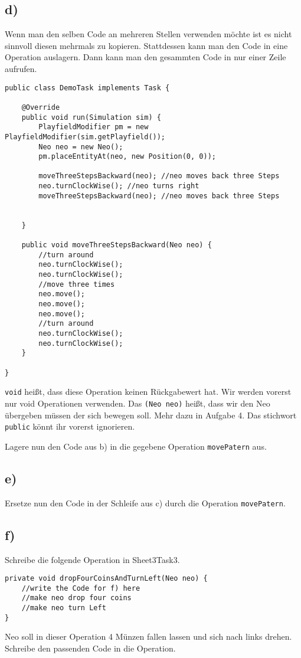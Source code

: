 \subsection*{d)}
	\begin{Infobox}[Operation]
		Wenn man den selben Code an mehreren Stellen verwenden möchte ist es nicht sinnvoll diesen mehrmals zu kopieren. Stattdessen kann man den Code in eine Operation auslagern. Dann kann man den gesammten Code in nur einer Zeile  aufrufen.
				\begin{lstlisting}
public class DemoTask implements Task {
    
    @Override
    public void run(Simulation sim) {
        PlayfieldModifier pm = new PlayfieldModifier(sim.getPlayfield());
        Neo neo = new Neo();
        pm.placeEntityAt(neo, new Position(0, 0));
     
        moveThreeStepsBackward(neo); //neo moves back three Steps
        neo.turnClockWise(); //neo turns right
        moveThreeStepsBackward(neo); //neo moves back three Steps
	
        
    }
    
    public void moveThreeStepsBackward(Neo neo) {
        //turn around
        neo.turnClockWise();
        neo.turnClockWise();
        //move three times
        neo.move();
        neo.move();
        neo.move();
        //turn around
        neo.turnClockWise();
        neo.turnClockWise();
    }
    
}
		\end{lstlisting}
\lstinline{void} heißt, dass diese Operation keinen Rückgabewert hat. 
Wir werden vorerst nur void Operationen verwenden. 
Das \lstinline{(Neo neo)} heißt, dass wir den Neo übergeben müssen der sich bewegen soll. 
Mehr dazu in Aufgabe 4. 
Das stichwort \lstinline{public} könnt ihr vorerst ignorieren.
 	\end{Infobox}
Lagere nun den Code aus b) in die gegebene Operation  \lstinline{movePatern} aus.
\subsection*{e)}
Ersetze nun den Code in der Schleife aus c) durch die Operation  \lstinline{movePatern}.
\subsection*{f)}
Schreibe die folgende Operation in Sheet3Task3.
\begin{lstlisting}
private void dropFourCoinsAndTurnLeft(Neo neo) {
    //write the Code for f) here
    //make neo drop four coins
    //make neo turn Left
}
\end{lstlisting}
Neo soll in dieser Operation 4 Münzen fallen lassen und sich nach links drehen. Schreibe den passenden Code in die Operation.
